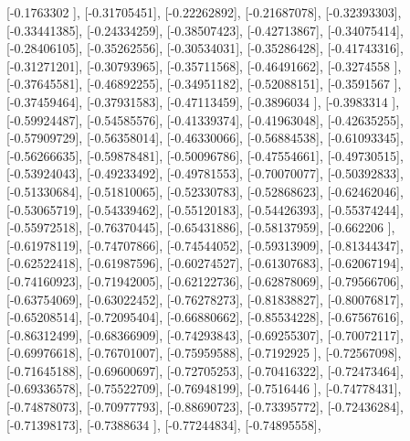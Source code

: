 \documentclass{article}
\begin{document}
       [-0.1763302 ],
       [-0.31705451],
       [-0.22262892],
       [-0.21687078],
       [-0.32393303],
       [-0.33441385],
       [-0.24334259],
       [-0.38507423],
       [-0.42713867],
       [-0.34075414],
       [-0.28406105],
       [-0.35262556],
       [-0.30534031],
       [-0.35286428],
       [-0.41743316],
       [-0.31271201],
       [-0.30793965],
       [-0.35711568],
       [-0.46491662],
       [-0.3274558 ],
       [-0.37645581],
       [-0.46892255],
       [-0.34951182],
       [-0.52088151],
       [-0.3591567 ],
       [-0.37459464],
       [-0.37931583],
       [-0.47113459],
       [-0.3896034 ],
       [-0.3983314 ],
       [-0.59924487],
       [-0.54585576],
       [-0.41339374],
       [-0.41963048],
       [-0.42635255],
       [-0.57909729],
       [-0.56358014],
       [-0.46330066],
       [-0.56884538],
       [-0.61093345],
       [-0.56266635],
       [-0.59878481],
       [-0.50096786],
       [-0.47554661],
       [-0.49730515],
       [-0.53924043],
       [-0.49233492],
       [-0.49781553],
       [-0.70070077],
       [-0.50392833],
       [-0.51330684],
       [-0.51810065],
       [-0.52330783],
       [-0.52868623],
       [-0.62462046],
       [-0.53065719],
       [-0.54339462],
       [-0.55120183],
       [-0.54426393],
       [-0.55374244],
       [-0.55972518],
       [-0.76370445],
       [-0.65431886],
       [-0.58137959],
       [-0.662206  ],
       [-0.61978119],
       [-0.74707866],
       [-0.74544052],
       [-0.59313909],
       [-0.81344347],
       [-0.62522418],
       [-0.61987596],
       [-0.60274527],
       [-0.61307683],
       [-0.62067194],
       [-0.74160923],
       [-0.71942005],
       [-0.62122736],
       [-0.62878069],
       [-0.79566706],
       [-0.63754069],
       [-0.63022452],
       [-0.76278273],
       [-0.81838827],
       [-0.80076817],
       [-0.65208514],
       [-0.72095404],
       [-0.66880662],
       [-0.85534228],
       [-0.67567616],
       [-0.86312499],
       [-0.68366909],
       [-0.74293843],
       [-0.69255307],
       [-0.70072117],
       [-0.69976618],
       [-0.76701007],
       [-0.75959588],
       [-0.7192925 ],
       [-0.72567098],
       [-0.71645188],
       [-0.69600697],
       [-0.72705253],
       [-0.70416322],
       [-0.72473464],
       [-0.69336578],
       [-0.75522709],
       [-0.76948199],
       [-0.7516446 ],
       [-0.74778431],
       [-0.74878073],
       [-0.70977793],
       [-0.88690723],
       [-0.73395772],
       [-0.72436284],
       [-0.71398173],
       [-0.7388634 ],
       [-0.77244834],
       [-0.74895558],
\end{document}
